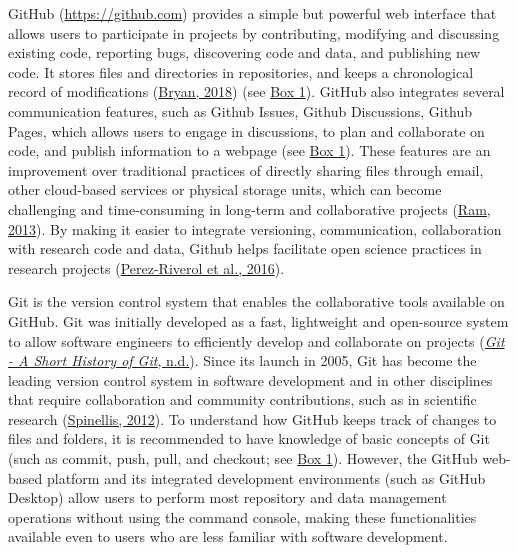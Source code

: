 GitHub (\url{https://github.com}) provides a simple but powerful web interface that allows users to participate in projects by contributing, modifying and discussing existing code, reporting bugs, discovering code and data, and publishing new code.
It stores files and directories in repositories, and keeps a chronological record of modifications (\protect\hyperlink{ref-RVetqmsg}{Bryan, 2018}) (see \protect\hyperlink{definitions}{Box 1}).
GitHub also integrates several communication features, such as Github Issues, Github Discussions, Github Pages, which allows users to engage in discussions, to plan and collaborate on code, and publish information to a webpage (see \protect\hyperlink{definitions}{Box 1}).
These features are an improvement over traditional practices of directly sharing files through email, other cloud-based services or physical storage units, which can become challenging and time-consuming in long-term and collaborative projects (\protect\hyperlink{ref-4ny1onB0}{Ram, 2013}).
By making it easier to integrate versioning, communication, collaboration with research code and data, Github helps facilitate open science practices in research projects (\protect\hyperlink{ref-kEX5dgzK}{Perez-Riverol et al., 2016}).

Git is the version control system that enables the collaborative tools available on GitHub.
Git was initially developed as a fast, lightweight and open-source system to allow software engineers to efficiently develop and collaborate on projects (\protect\hyperlink{ref-1CM2EcdVk}{\emph{Git - A Short History of Git}, n.d.}).
Since its launch in 2005, Git has become the leading version control system in software development and in other disciplines that require collaboration and community contributions, such as in scientific research (\protect\hyperlink{ref-7q3wZN6d}{Spinellis, 2012}).
To understand how GitHub keeps track of changes to files and folders, it is recommended to have knowledge of basic concepts of Git (such as commit, push, pull, and checkout; see \protect\hyperlink{definitions}{Box 1}).
However, the GitHub web-based platform and its integrated development environments (such as GitHub Desktop) allow users to perform most repository and data management operations without using the command console, making these functionalities available even to users who are less familiar with software development.

